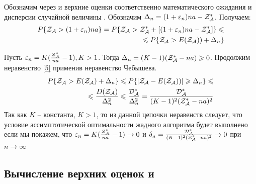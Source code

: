 \documentclass[a4paper, 14pt]{extarticle}
\numberwithin{equation}{section}
\begin{document}
Обозначим через \topboundE{} и \topboundD{} верхние оценки соответственно математического ожидания \randomvalueE{} и дисперсии \randomvalueD{} случайной величины \randomvalue{} . Обозначим $\Delta_n=(1+\varepsilon_n)na-\text{$\mathcal{Z^*_{A}}$}$. Получаем:
\begin{equation}\label{5}
\begin{aligned}
P\{\text{$\mathcal{Z_{A}}$} > (1+\varepsilon_n)na\} = 
P\{\text{$\mathcal{Z_{A}}$} > \text{$\mathcal{Z^*_{A}}$}+[(1+\varepsilon_n)na-\text{$\mathcal{Z^*_{A}}$}]\} \leqslant \\
\leqslant
P\{\text{$\mathcal{Z_{A}}$} > \text{$E(\text{$\mathcal{Z_{A}}$})$})+ \Delta_n\}
\end{aligned}
\end{equation}

Пусть $\varepsilon_n = K(\frac{\text{$\mathcal{Z^*_{A}}$}}{na}-1), K>1$.
Тогда $ \Delta_n = (K-1)(\text{$\mathcal{Z^*_{A}}$}-na) \geqslant 0$.
Продолжим неравенство \eqref{5} применив неравенство Чебышева.
\begin{align*}\label{6}
P\{\text{$\mathcal{Z_{A}}$}> E(\text{$\mathcal{Z_{A}}$})+ \Delta_n\} \leqslant 
P\{|\text{$\mathcal{Z_{A}}$}- \text{$E(\text{$\mathcal{Z_{A}}$})$})| \geqslant \Delta_n\} \leqslant \\
\leqslant \frac{\text{$D(\text{$\mathcal{Z_{A}}$})$}}{\Delta^2_n} \leqslant
\frac{\text{$\mathcal{D^*_{A}}$}}{\Delta^2_n} = 
\frac{\text{$\mathcal{D^*_{A}}$}}{(K-1)^2(\text{$\mathcal{Z^*_{A}}$}-na)^2}
\end{align*}
Так как $K$ -- константа, $K>1$, то из данной цепочки неравенств следует, что условие ассимптотической оптимальности жадного алгоритма будет выполнено если мы покажем, что
$ \varepsilon_n=K(\frac{\text{$\mathcal{Z^*_{A}}$}}{na}-1) \rightarrow 0$ и 
$ \delta_n = \frac{\text{$\mathcal{D^*_{A}}$}}{(K-1)^2(\text{$\mathcal{Z^*_{A}}$}-na)^2} \rightarrow 0$ при $ n \rightarrow \infty$\\

\subsection{Вычисление верхних оценок \topboundE{} и \topboundD{}}

\newcommand{\chanceLklesserX}{$\Phi_k(x)$}
\newcommand{\randomNormalValueE}{$l_k$}
\end{document}
